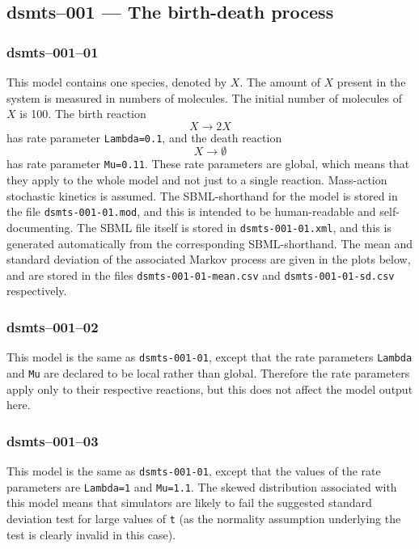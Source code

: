 
\subsection{dsmts--001 --- The birth-death process}

\subsubsection{dsmts--001--01} 

This model contains one species, denoted by $X$. The amount of $X$
present in the system is measured in numbers of molecules. The initial
number of molecules of $X$ is 100. The birth reaction 
\[
X \longrightarrow 2X
\] 
has rate parameter \verb$Lambda=0.1$, and the death reaction 
\[
X\longrightarrow \emptyset
\]
has rate parameter \verb$Mu=0.11$. These
rate parameters are global, which means that they apply to the whole
model and not just to a single reaction. Mass-action stochastic
kinetics is assumed. The SBML-shorthand for the model is stored in the
file \verb$dsmts-001-01.mod$, and this is intended to be
human-readable and self-documenting. The SBML file itself is stored in
\verb$dsmts-001-01.xml$, and this is generated automatically from the
corresponding SBML-shorthand. The mean and standard deviation of the
associated Markov process are given in the plots below, and are stored
in the files \verb$dsmts-001-01-mean.csv$ and
\verb$dsmts-001-01-sd.csv$ respectively.


\subsubsection{dsmts--001--02}

This model is the same as \texttt{dsmts-001-01}, except that the rate
parameters \verb$Lambda$ and \verb$Mu$ are declared to be local rather
than global. Therefore the rate parameters apply only to their
respective reactions, but this does not affect the model output
here. 


\subsubsection{dsmts--001--03}

This model is the same as \texttt{dsmts-001-01}, except that the
values of the rate parameters are \verb$Lambda=1$ and
\verb$Mu=1.1$. The skewed distribution associated with this model
means that simulators are likely to fail the suggested standard
deviation test for large values of \verb$t$ (as the normality
assumption underlying the test is clearly invalid in this
case).

